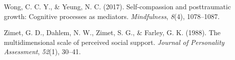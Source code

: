 \documentclass[
  man]{apa7}
\newlength{\cslhangindent}
\newlength{\cslentryspacingunit} %
\newenvironment{CSLReferences}[2] %
 {%
  \setlength{\parindent}{0pt}
  \ifodd #1
  \let\oldpar\par
  \def\par{\hangindent=\cslhangindent\oldpar}
  \fi
  \setlength{\parskip}{#2\cslentryspacingunit}
 }%
 {}
\begin{document}
\begin{CSLReferences}{1}{0}
\leavevmode{}%
Wong, C. C. Y., \& Yeung, N. C. (2017). Self-compassion and posttraumatic growth: Cognitive processes as mediators. \emph{Mindfulness}, \emph{8}(4), 1078--1087.

\leavevmode{}%
Zimet, G. D., Dahlem, N. W., Zimet, S. G., \& Farley, G. K. (1988). The multidimensional scale of perceived social support. \emph{Journal of Personality Assessment}, \emph{52}(1), 30--41.

\end{CSLReferences}
\end{document}
